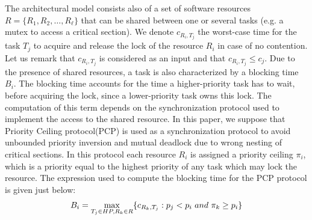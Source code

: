 \documentclass[runningheads,a4paper]{llncs}
\begin{document}
The architectural model consists also of a set of software resources $R =\{R_1,R_2,\ldots,R_\ell \}$ that can be shared between one or several tasks (e.g. a mutex to access a critical section). We denote $c_{R_i,T_j}$ the worst-case time for the task $T_j$ to acquire and release the lock of the resource $R_i$ in case of no contention. Let us remark that $c_{R_i,T_j}$ is considered as an input and that $c_{R_i,T_j} \leq c_j$. Due to the presence of shared resources, a task is also characterized by a blocking time $B_i$. The blocking time accounts for the time a higher-priority task has to wait, before acquiring the lock, since a lower-priority task owns this lock. The computation of this term depends on the synchronization protocol used to implement the access to the shared resource. In this paper, we suppose that Priority Ceiling protocol(PCP) \cite{PCP} is used as a synchronization protocol to avoid unbounded priority inversion and mutual deadlock due to wrong nesting of critical sections. In this protocol each resource $R_i$ is assigned a priority ceiling $\pi_i$, which is a priority equal to the highest priority of any task which may lock the resource. The expression used to compute the blocking time for the PCP protocol is given just below: 
\begin{equation}
\footnotesize{B_{i} = \max_{T_j \in HP ,R_k \in R}\{ c_{R_k,T_j} : p_{j} < p_{i} \ and \ \pi_{k} \geq p_{i}\}}
\label{eq:blockingTime}
\end{equation}
\end{document}
